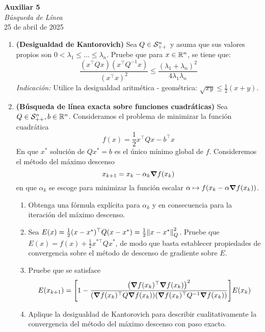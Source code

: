 \documentclass{article}
\begin{document}


\begin{center}
    \Huge{\textbf{Auxiliar 5}}\\
\textit{\large{Búsqueda de Línea}}\\
    \normalsize
	25 de abril de 2025
\end{center}

\begin{enumerate}
	\item \textbf{(Desigualdad de Kantorovich)} Sea \(Q \in \S^n_{++}\) y asuma que sus valores propios son \(0 < \lambda_1 \leq \dots \leq \lambda_n\). Pruebe que para \(x \in \R^n\), se tiene que:
		\[\frac{(x^\top Q x)(x^\top Q^{-1}x)}{(x^\top x)^2} \leq \frac{(\lambda_1 + \lambda_n)^2}{4\lambda_1\lambda_n}\]
		\textit{Indicación:} Utilice la desigualdad aritmética - geométrica: \(\sqrt{xy} \leq \frac12 (x+y)\).
	\item \textbf{(Búsqueda de línea exacta sobre funciones cuadráticas)} Sea \(Q \in \S^n_{++}, b \in \R^n\). Consideramos el problema de minimizar la función cuadrática
		\[f(x) = \frac12 x^\top Q x - b^\top x\]
		En que \(x^*\) solución de \(Qx^* = b\) es el único mínimo global de \(f\). Consideremos el método del máximo descenso
		\[x_{k+1} = x_k - \alpha_k \grad{f}(x_k)\]
		en que \(\alpha_k\) se escoge para minimizar la función escalar \(\alpha \mapsto f(x_k - \alpha\grad{f}(x_k))\).
		\begin{enumerate}
			\item Obtenga una fórmula explícita para \(\alpha_k\) y en consecuencia para la iteración del máximo descenso.
			\item Sea \(E(x) = \frac12 (x - x^*)^\top Q (x - x^*) = \frac12 \norm{x - x^*}^2_Q\). Pruebe que \(E(x) = f(x) + \frac12 x^{*\top}Qx^*\), de modo que basta establecer propiedades de convergencia sobre el método de descenso de gradiente sobre \(E\).
			\item Pruebe que se satisface
				\[E(x_{k+1}) = \qty[1 - \frac{\qty(\grad{f}(x_k)^\top \grad{f}(x_k))^2}{\qty(\grad{f}(x_k)^\top Q \grad{f}(x_k))\qty(\grad{f}(x_k)^\top Q^{-1} \grad{f}(x_k))}] E(x_k)\]
			\item Aplique la desigualdad de Kantorovich para describir cualitativamente la convergencia del método del máximo descenso con paso exacto.
		\end{enumerate}
\end{enumerate}
\end{document}
